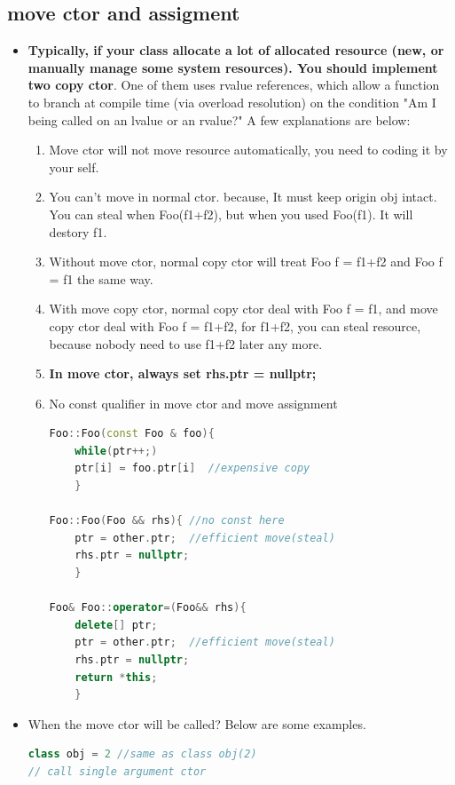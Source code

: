 \documentclass[a4paper,11pt,twoside]{book}
\begin{document}
\subsection{move ctor and assigment}
\begin{itemize}
	\item \textbf{Typically, if your class allocate a lot of allocated resource (new, or manually manage some system resources).  You should implement two copy ctor}. One of them uses rvalue references, which allow a function to branch at compile time (via overload resolution) on the condition "Am I being called on an lvalue or an rvalue?" A few explanations are below:
	
	\begin{enumerate}
		\item Move ctor will not move resource automatically, you need to coding it by your self.
		
		\item You can't move in normal ctor. because, It must keep origin obj intact.  You can steal when Foo(f1+f2), but when you used Foo(f1).  It will destory f1.
		
		\item Without  move ctor, normal copy ctor will treat Foo f = f1+f2 and Foo f = f1 the same way.
		
		\item With move copy ctor, normal copy ctor deal with Foo f = f1, and move copy ctor deal with Foo f = f1+f2, for f1+f2, you can steal resource, because nobody need to use f1+f2 later any more.
		
		\item \textbf{In move ctor, always set rhs.ptr = nullptr;}
		
		\item No const qualifier in move ctor and move assignment
\begin{lstlisting}[frame=single, language=c++]
Foo::Foo(const Foo & foo){
	while(ptr++;)
	ptr[i] = foo.ptr[i]  //expensive copy
	}
		
Foo::Foo(Foo && rhs){ //no const here
	ptr = other.ptr;  //efficient move(steal)
	rhs.ptr = nullptr;
	}
		
Foo& Foo::operator=(Foo&& rhs){
	delete[] ptr;
	ptr = other.ptr;  //efficient move(steal)
	rhs.ptr = nullptr;
	return *this;
	}
\end{lstlisting}
		
	\end{enumerate}
	
\item When the move ctor will be called? Below are some examples.
\begin{lstlisting}[frame=single, language=c++]
class obj = 2 //same as class obj(2)
// call single argument ctor
	

\end{lstlisting}
\end{itemize}
\end{document}
